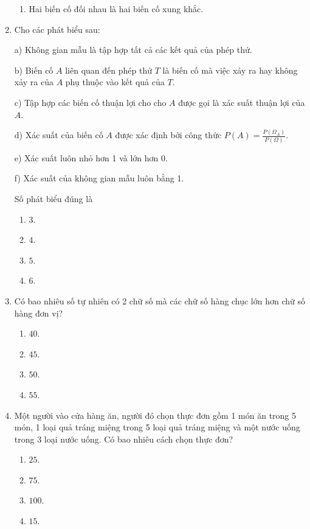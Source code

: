 \begin{enumerate}[label=\textbf{Câu \arabic*.},align=left,left=0cm..0cm,itemindent=*]
\begin{enumerate}[label=\textbf{\Alph*.},align=left,left=1cm..0cm,itemindent=*]
		\item Hai biến cố đối nhau là hai biến cố xung khắc.
	\end{enumerate}
	\item Cho các phát biểu sau:\par
	a) Không gian mẫu là tập hợp tất cả các kết quả của phép thử.\par
	b) Biến cố $A$ liên quan đến phép thử $T$ là biến cố mà việc xảy ra hay không xảy ra của $A$ phụ thuộc vào kết quả của $T$.\par
	c) Tập hợp các biến cố thuận lợi cho cho $A$ được gọi là xác suất thuận lợi của $A$.\par
	d) Xác suất của biến cố $A$ được xác định bởi công thức $P(A)=\frac{P(\Omega_A)}{P(\Omega)}$.\par
	e) Xác suất luôn nhỏ hơn 1 và lớn hơn 0.\par
	f) Xác suất của không gian mẫu luôn bằng 1.\par
	Số phát biểu đúng là
	\begin{multicols}{4}\begin{enumerate}[label=\textbf{\Alph*.},align=left,left=1cm..0cm,itemindent=*]
		\item $3$. \item $4$. \item $5$. \item $6$.
	\end{enumerate}\end{multicols}
	\item Có bao nhiêu số tự nhiên có 2 chữ số mà các chữ số hàng chục lớn hơn chữ số hàng đơn vị?
	\begin{multicols}{4}\begin{enumerate}[label=\textbf{\Alph*.},align=left,left=1cm..0cm,itemindent=*]
		\item $40$. \item $45$. \item $50$. \item $55$.
	\end{enumerate}\end{multicols}
	\item Một người vào cửa hàng ăn, người đó chọn thực đơn gồm 1 món ăn trong 5 món, 1 loại quả tráng miệng trong 5 loại quả tráng miệng và một nước uống trong 3 loại nước uống. Có bao nhiêu cách chọn thực đơn?
	\begin{multicols}{4}\begin{enumerate}[label=\textbf{\Alph*.},align=left,left=1cm..0cm,itemindent=*]
		\item $25$. \item $75$. \item $100$. \item $15$.

\end{enumerate}
\end{multicols}
\end{enumerate}

